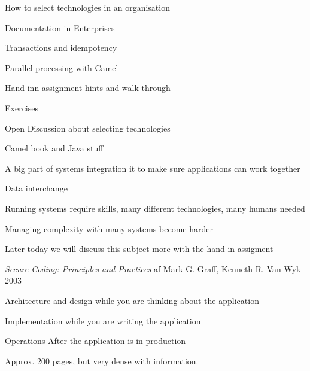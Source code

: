 \documentclass[Screen16to9,17pt]{foils}
\begin{document}
\begin{list2}
\item How to select technologies in an organisation
\item Documentation in Enterprises
\item Transactions and idempotency
\item Parallel processing with Camel
\item Hand-inn assignment hints and walk-through
\end{list2}

Exercises
\begin{list2}
\item Open Discussion about selecting technologies
\item Camel book and Java stuff
\end{list2}









\begin{list2}
\item A big part of systems integration it to make sure applications can work together
\item Data interchange
\item Running systems require skills, many different technologies, many humans needed
\item Managing complexity with many systems become harder
\end{list2}

Later today we will discuss this subject more with the hand-in assigment



\vskip 2cm
{\emph{Secure Coding: Principles and Practices} af Mark G. Graff, Kenneth R. Van Wyk 2003}



\begin{list1}
\item Architecture and design while you are thinking about the application
\item Implementation while you are writing the application
\item Operations After the application is in production
\item Approx. 200 pages, but very dense with information.
\end{list1}
\end{document}
